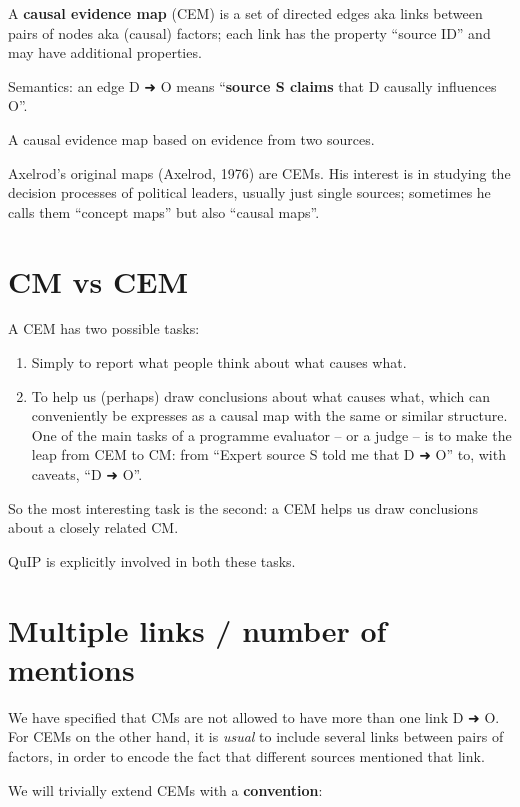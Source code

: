 \documentclass[
]{book}
\begin{document}
A \textbf{causal evidence map} (CEM) is a set of directed edges aka links between pairs of nodes aka (causal) factors; each link has the property ``source ID'' and may have additional properties.

Semantics: an edge D ➜ O means ``\textbf{source S claims} that D causally influences O''.

A causal evidence map based on evidence from two sources.

Axelrod's original maps (Axelrod, 1976) are CEMs. His interest is in studying the decision processes of political leaders, usually just single sources; sometimes he calls them ``concept maps'' but also ``causal maps''.

\hypertarget{cm-vs-cem}{%
\section{CM vs CEM}\label{cm-vs-cem}}

A CEM has two possible tasks:

\begin{enumerate}
\def\labelenumi{\arabic{enumi})}
\item
  Simply to report what people think about what causes what.
\item
  To help us (perhaps) draw conclusions about what causes what, which can conveniently be expresses as a causal map with the same or similar structure. One of the main tasks of a programme evaluator -- or a judge -- is to make the leap from CEM to CM: from ``Expert source S told me that D ➜ O'' to, with caveats, ``D ➜ O''.
\end{enumerate}

So the most interesting task is the second: a CEM helps us draw conclusions about a closely related CM.

QuIP is explicitly involved in both these tasks.

\hypertarget{multiple-links-number-of-mentions}{%
\section{Multiple links / number of mentions}\label{multiple-links-number-of-mentions}}

We have specified that CMs are not allowed to have more than one link D ➜ O. For CEMs on the other hand, it is \emph{usual} to include several links between pairs of factors, in order to encode the fact that different sources mentioned that link.

We will trivially extend CEMs with a \textbf{convention}:
\end{document}
